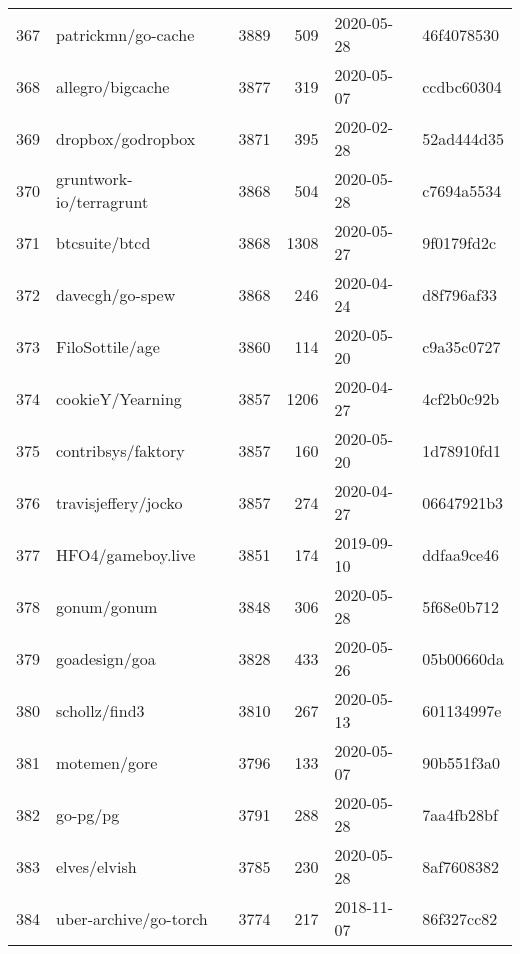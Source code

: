 \begin{longtable}{llrrll}
    367 &                                 patrickmn/go-cache &   3889 &    509 & 2020-05-28 &  46f4078530 \\
    368 &                                   allegro/bigcache &   3877 &    319 & 2020-05-07 &  ccdbc60304 \\
    369 &                                  dropbox/godropbox &   3871 &    395 & 2020-02-28 &  52ad444d35 \\
    370 &                            gruntwork-io/terragrunt &   3868 &    504 & 2020-05-28 &  c7694a5534 \\
    371 &                                      btcsuite/btcd &   3868 &   1308 & 2020-05-27 &  9f0179fd2c \\
    372 &                                    davecgh/go-spew &   3868 &    246 & 2020-04-24 &  d8f796af33 \\
    373 &                                    FiloSottile/age &   3860 &    114 & 2020-05-20 &  c9a35c0727 \\
    374 &                                   cookieY/Yearning &   3857 &   1206 & 2020-04-27 &  4cf2b0c92b \\
    375 &                                 contribsys/faktory &   3857 &    160 & 2020-05-20 &  1d78910fd1 \\
    376 &                                travisjeffery/jocko &   3857 &    274 & 2020-04-27 &  06647921b3 \\
    377 &                                  HFO4/gameboy.live &   3851 &    174 & 2019-09-10 &  ddfaa9ce46 \\
    378 &                                        gonum/gonum &   3848 &    306 & 2020-05-28 &  5f68e0b712 \\
    379 &                                      goadesign/goa &   3828 &    433 & 2020-05-26 &  05b00660da \\
    380 &                                      schollz/find3 &   3810 &    267 & 2020-05-13 &  601134997e \\
    381 &                                       motemen/gore &   3796 &    133 & 2020-05-07 &  90b551f3a0 \\
    382 &                                           go-pg/pg &   3791 &    288 & 2020-05-28 &  7aa4fb28bf \\
    383 &                                       elves/elvish &   3785 &    230 & 2020-05-28 &  8af7608382 \\
    384 &                              uber-archive/go-torch &   3774 &    217 & 2018-11-07 &  86f327cc82 \\

\end{longtable}
